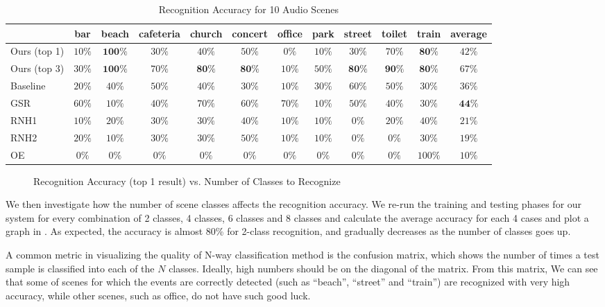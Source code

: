 \begin{table*}[th]
\centering
\small
\caption{Recognition Accuracy for 10 Audio Scenes}
\label{tab:ac}
\begin{tabular}{lccccccccccc}
\hline
 & bar & beach & cafeteria & church & concert & office & park & street & toilet & train & average\\
\hline
Ours (top 1)  & $10\%$ & $\mathbf{100\%}$ & $30\%$ & $40\%$ & $50\%$ & $0\%$ & $10\%$ & $30\%$ & $70\%$ & $\mathbf{80\%}$ & $42\%$\\
Ours (top 3)  & $30\%$ & $\mathbf{100\%}$ & $70\%$ & $\mathbf{80\%}$ & $\mathbf{80\%}$ & $10\%$ & $50\%$ & $\mathbf{80\%}$ & $\mathbf{90\%}$ & $\mathbf{80\%}$ & $67\%$ \\
\hline Baseline  & $20\%$ & $40\%$ & $50\%$ & $40\%$ & $30\%$ & $10\%$ & $30\%$ & $60\%$ & $50\%$ & $30\%$ & $36\%$\\
\hline GSR & $60\%$ & $10\%$ & $40\%$ & $70\%$ & $60\%$ & $70\%$ & $10\%$ & $50\%$ & $40\%$ & $30\%$ & $\mathbf{44\%}$\\
\hline RNH1 & $10\%$ & $20\%$ & $30\%$ & $30\%$ & $40\%$ & $10\%$ & $10\%$ & $0\%$ & $20\%$ & $40\%$ & $21\%$\\
\hline RNH2 & $20\%$ & $10\%$ & $30\%$ & $30\%$ & $50\%$ & $10\%$ & $10\%$ & $0\%$ & $0\%$ & $30\%$ & $19\%$\\
\hline OE & $0\%$ & $0\%$ & $0\%$ & $0\%$ & $0\%$ & $0\%$ & $0\%$ & $0\%$ & $0\%$ & $100\%$ & $10\%$\\ \hline
\end{tabular}
\end{table*}

\begin{figure}[th]
\centering
{}
\caption{Recognition Accuracy (top 1 result) vs. Number of Classes to Recognize}
\label{fig:ac}
\end{figure}

We then investigate how the number of scene classes affects the recognition
accuracy. We re-run the training and testing phases for our system for
every combination of 2 classes, 4 classes, 6 classes and 8 classes and
calculate the average accuracy for each 4 cases and plot a graph in .
As expected, the accuracy is almost 80\% for 2-class recognition,
and gradually decreases as the number of classes goes up.

A common metric in visualizing the quality of N-way classification method
is the confusion matrix, which shows the number of times a test sample is
classified into each of the $N$ classes. Ideally, high numbers should be on
the diagonal of the matrix. From this matrix,
We can see that some of scenes for which the events are correctly detected
(such as ``beach'', ``street'' and ``train'') are
recognized with very high accuracy,
while other scenes, such as office, do not have such good luck.

